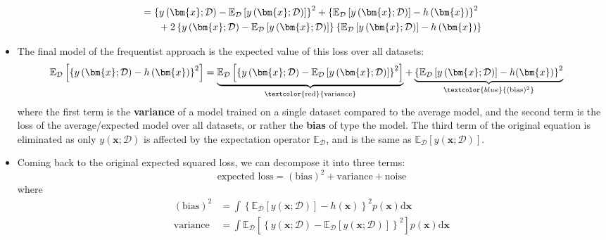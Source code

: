 \begin{itemize}
\begin{equation*}
\begin{split}
			& = \left\{y\left(\bm{x};\mathcal{D}\right) - \mathbb{E}_{\mathcal{D}}\left[y\left(\bm{x};\mathcal{D}\right)\right]\right\}^2 + \left\{\mathbb{E}_{\mathcal{D}}\left[y\left(\bm{x};\mathcal{D}\right)\right] - h\left(\bm{x}\right)\right\}^2 \\
			& \text{\hspace{5mm} } + 2\left\{y\left(\bm{x};\mathcal{D}\right) - \mathbb{E}_{\mathcal{D}}\left[y\left(\bm{x};\mathcal{D}\right)\right]\right\}\left\{ \mathbb{E}_{\mathcal{D}}\left[y\left(\bm{x};\mathcal{D}\right)\right] - h\left(\bm{x}\right)\right\}
		\end{split}
	\end{equation*}
	\item The final model of the frequentist approach is the expected value of this loss over all datasets:
	\begin{equation*}
		\begin{split}
			\mathbb{E}_{\mathcal{D}}\left[\left\{y\left(\bm{x};\mathcal{D}\right) - h\left(\bm{x}\right)\right\}^2\right] & = \underbrace{\mathbb{E}_{\mathcal{D}}\left[\left\{y\left(\bm{x};\mathcal{D}\right) - \mathbb{E}_{\mathcal{D}}\left[y\left(\bm{x};\mathcal{D}\right)\right]\right\}^2\right]}_{\text{\textcolor{red}{variance}}} + \underbrace{\left\{\mathbb{E}_{\mathcal{D}}\left[y\left(\bm{x};\mathcal{D}\right)\right] - h(\bm{x})\right\}^2}_{\textcolor{blue}{(\text{bias})^2}}
		\end{split}
	\end{equation*}
	where the first term is the \textbf{variance} of a model trained on a single dataset compared to the average model, and the second term is the loss of the average/expected model over all datasets, or rather the \textbf{bias} of type the model. The third term of the original equation is eliminated as only $y(\bm{x};\mathcal{D})$ is affected by the expectation operator $\mathbb{E}_{\mathcal{D}}$, and is the same as $\mathbb{E}_{\mathcal{D}}\left[y\left(\bm{x};\mathcal{D}\right)\right]$. 
	\item Coming back to the original expected squared loss, we can decompose it into three terms:
	$$\text{expected loss} = (\text{bias})^2 + \text{variance} + \text{noise}$$
	where
	\begin{equation*}
		\begin{split}
			(\text{bias})^2 &= \int \left\{\mathbb{E}_{\mathcal{D}}\left[y\left(\bm{x};\mathcal{D}\right)\right] - h(\bm{x})\right\}^2p(\bm{x}) \text{d}\bm{x}\\
			\text{variance} &= \int \mathbb{E}_{\mathcal{D}}\left[\left\{y\left(\bm{x};\mathcal{D}\right) - \mathbb{E}_{\mathcal{D}}\left[y\left(\bm{x};\mathcal{D}\right)\right]\right\}^2\right]p(\bm{x}) \text{d}\bm{x}\\

\end{split}
\end{equation*}
\end{itemize}
